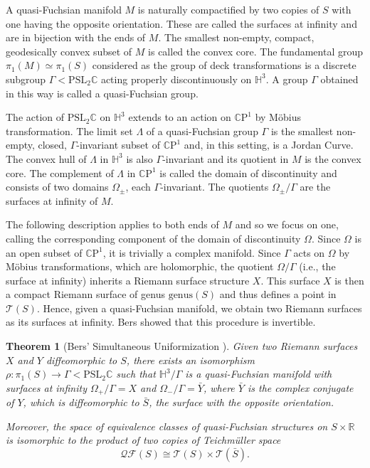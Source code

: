 \documentclass{amsart}
\newcommand{\R}{\mathbb{R}}
\newcommand{\C}{\mathbb{C}}
\newcommand{\CP}{\mathbb{C}\mathrm{P}}
\renewcommand{\H}{\mathbb{H}}
\newtheorem{thm}{Theorem}[section]
\begin{document}
A quasi-Fuchsian manifold $M$ is naturally compactified by two copies of $S$ with one having the opposite orientation. 
These are called the surfaces at infinity and are in bijection with the ends of $M$. 
The smallest non-empty, compact, geodesically convex subset of $M$ is called the convex core. 
The fundamental group $\pi_1(M) \simeq \pi_1(S)$ considered as the group of deck transformations is a discrete subgroup $\Gamma < \mathrm{PSL}_2\C$ acting properly discontinuously on $\H^3$. 
A group $\Gamma$ obtained in this way is called a quasi-Fuchsian group.


The action of $\mathrm{PSL}_2\C$ on $\H^3$ extends to an action on $\CP^1$ by M\"obius transformation. 
The limit set $\Lambda$ of a quasi-Fuchsian group $\Gamma$ is the smallest non-empty, closed, $\Gamma$-invariant subset of $\CP^1$ and, in this setting, is a Jordan Curve. 
The convex hull of $\Lambda$ in $\H^3$ is also $\Gamma$-invariant and its quotient in $M$ is the convex core. 
The complement of $\Lambda$ in $\CP^1$ is called the domain of discontinuity and consists of two domains $\Omega_\pm$, each $\Gamma$-invariant. 
The quotients $\Omega_\pm /\Gamma$ are the surfaces at infinity of $M$.


The following description applies to both ends of $M$ and so we focus on one, calling the corresponding component of the domain of discontinuity $\Omega$. 
Since $\Omega$ is an open subset of $\CP^1$, it is trivially a complex manifold. 
Since $\Gamma$ acts on $\Omega$ by M\"obius transformations, which are holomorphic, the quotient $\Omega/\Gamma$ (i.e., the surface at infinity) inherits a Riemann surface structure $X$. 
This surface $X$ is then a compact Riemann surface of genus $\mathrm{genus}(S)$ and thus defines a point in $\mathcal{T}(S)$. 
Hence, given a quasi-Fuchsian manifold, we obtain two Riemann surfaces as its surfaces at infinity. 
Bers showed that this procedure is invertible. 

\begin{thm}[Bers' Simultaneous Uniformization \cite{bers1960}]
Given two Riemann surfaces $X$ and $Y$ diffeomorphic to $S$, there exists an isomorphism $\rho: \pi_1(S) \to \Gamma < \mathrm{PSL}_2\C$ such that $\H^3/\Gamma$ is a quasi-Fuchsian manifold with surfaces at infinity $\Omega_+/\Gamma = X$ and $\Omega_- / \Gamma = \bar{Y}$, where $\bar{Y}$ is the complex conjugate of $Y$, which is diffeomorphic to $\bar{S}$, the surface with the opposite orientation.

Moreover, the space of equivalence classes of quasi-Fuchsian structures on $S \times \R$ is isomorphic to the product of two copies of Teichm\"uller space
\[
\mathcal{QF}(S) \cong \mathcal{T}(S) \times \mathcal{T}(\bar{S}).
\]
\end{thm}
\end{document}

